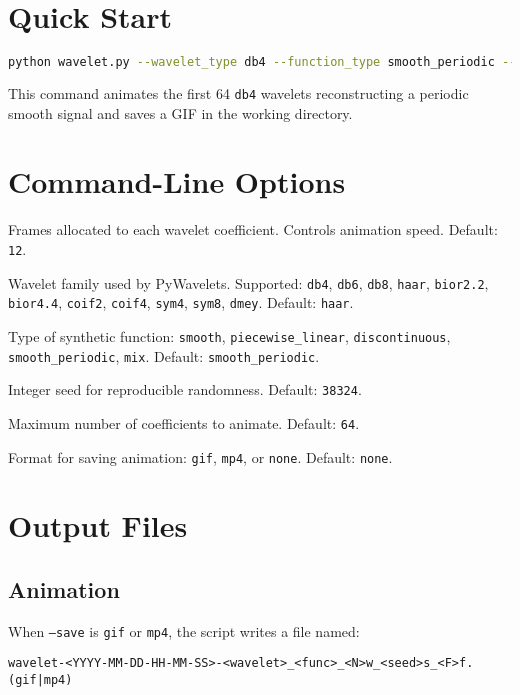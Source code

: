 \documentclass[12pt]{article}
\begin{document}
\section{Quick Start}
\begin{lstlisting}[language=bash]
python wavelet.py --wavelet_type db4 --function_type smooth_periodic --save gif
\end{lstlisting}
This command animates the first 64 \texttt{db4} wavelets reconstructing a periodic smooth signal and saves a GIF in the working directory.

\section{Command-Line Options}
\begin{description}[leftmargin=1.8cm, style=sameline]
  \item[\texttt{--frames\_per\_wavelet}] Frames allocated to each wavelet coefficient. Controls animation speed. Default: \texttt{12}.
  \item[\texttt{--wavelet\_type}] Wavelet family used by PyWavelets. Supported: \texttt{db4}, \texttt{db6}, \texttt{db8}, \texttt{haar}, \texttt{bior2.2}, \texttt{bior4.4}, \texttt{coif2}, \texttt{coif4}, \texttt{sym4}, \texttt{sym8}, \texttt{dmey}. Default: \texttt{haar}.
  \item[\texttt{--function\_type}] Type of synthetic function: \texttt{smooth}, \texttt{piecewise\_linear}, \texttt{discontinuous}, \texttt{smooth\_periodic}, \texttt{mix}. Default: \texttt{smooth\_periodic}.
  \item[\texttt{--function\_seed}] Integer seed for reproducible randomness. Default: \texttt{38324}.
  \item[\texttt{--number\_wavelets}] Maximum number of coefficients to animate. Default: \texttt{64}.
  \item[\texttt{--save}] Format for saving animation: \texttt{gif}, \texttt{mp4}, or \texttt{none}. Default: \texttt{none}.
\end{description}

\section{Output Files}
\subsection*{Animation}
When \texttt{--save} is \texttt{gif} or \texttt{mp4}, the script writes a file named:
\begin{center}
\texttt{wavelet-<YYYY-MM-DD-HH-MM-SS>-<wavelet>\_<func>\_<N>w\_<seed>s\_<F>f.(gif|mp4)}
\end{center}
\end{document}
